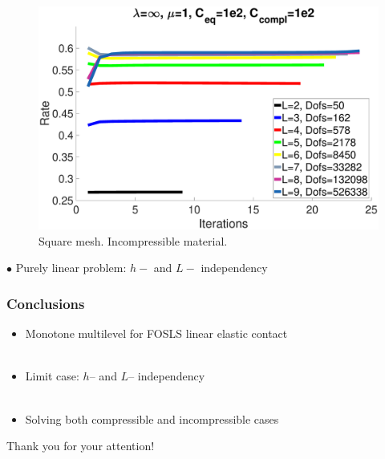 \documentclass[8pt, oneside]{beamer}   	%
\newcommand{\titlecolor}[1]{\frametitle{\textcolor{dkgrey}{ \textbf{#1}}}}
\begin{document}
\begin{frame}
\begin{figure}[htbp!]
	\quad
		\includegraphics[scale=0.08]{img/SquareRateIncompressible.eps}
	\caption{Square mesh. Incompressible material.}
	\label{ResidualRateSquare}	
	\end{figure}
	
	$\bullet$ Purely linear problem: $h-$ and $L-$ independency
\end{frame}





\begin{frame}
\titlecolor{Conclusions}
\begin{itemize}
\item Monotone multilevel for FOSLS linear elastic contact 
${}$\\${}$\\
\item Limit case: $h$-- and $L$-- independency
${}$\\${}$\\
\item Solving both compressible and incompressible cases
\end{itemize}
\end{frame}



\begin{frame}
\centering
\huge
Thank you for your attention!
\end{frame}

\appendix
\end{document}
